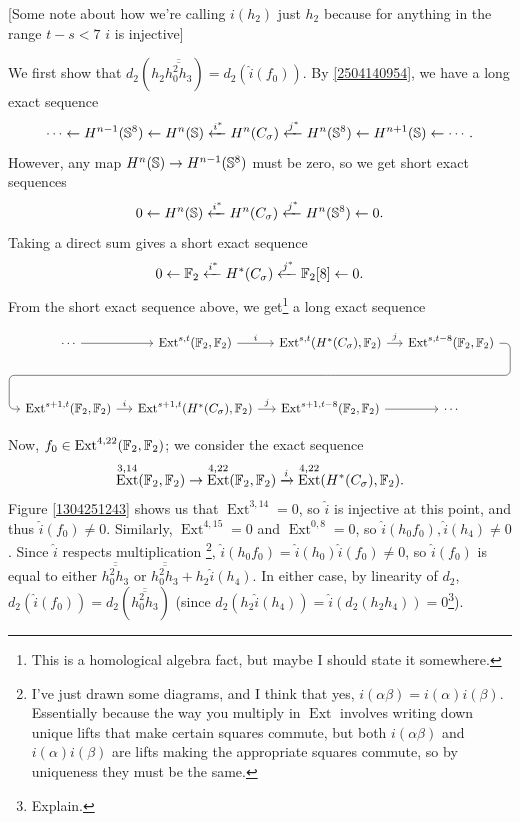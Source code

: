 \documentclass{MetricNotes2023}
\def\bb{\ensuremath\mathbb}
\DeclareMathOperator{\Ext}{Ext}
\begin{document}
\begin{ourproof}

[Some note about how we're calling \(i(h_2)\) just \(h_2\) because for anything in the range \(t-s<7\) \(i\) is injective]

We first show that \(d_2(h_2 \overline{\overline{h_0^2h_3}})=d_2(\hat i(f_0))\). By \ref{2504140954}, we have a long exact sequence
\[\cdots \leftarrow H^{n-1}(\bb{S}^8) \leftarrow H^n(\bb{S}) \xleftarrow{i^*} H^n(C_\sigma) \xleftarrow{j^*} H^n(\bb{S}^8)\leftarrow H^{n+1}(\bb{S}) \leftarrow \cdots.\]
However, any map \(H^n(\bb{S})\to H^{n-1}(\bb{S}^8)\) must be zero, so we get short exact sequences 
\[0 \leftarrow H^n(\bb{S})\xleftarrow{i^*} H^n(C_\sigma) \xleftarrow{j^*} H^n(\bb{S}^8)\leftarrow 0.\]
Taking a direct sum gives a short exact sequence
\[0 \leftarrow \bb{F}_2 \xleftarrow{i^*} H^*(C_\sigma) \xleftarrow{j^*} \bb{F}_2[8] \leftarrow 0.\]
From the short exact sequence above, we get\footnote{This is a homological algebra fact, but maybe I should state it somewhere.} a long exact sequence 

\[\begin{tikzcd}[row sep=8ex, column sep=3ex]
\cdots \arrow[r, ""] & \Ext^{s,t}(\bb{F}_2, \bb{F}_2) \arrow[r, "i"] & \Ext^{s,t}(H^*(C_\sigma), \bb{F}_2) \arrow[r, "j"] \ar[draw=none]{d}[name=X, anchor=center]{} & \Ext^{s,t-8}(\bb{F}_2, \bb{F}_2) \ar[rounded corners, to path={ -- ([xshift=2ex]\tikztostart.east) |- (X.center) \tikztonodes -| ([xshift=-2ex]\tikztotarget.west) -- (\tikztotarget)}]{dlll}[at end]{} \\
\Ext^{s+1,t}(\bb{F}_2, \bb{F}_2) \arrow[r, "i"] & \Ext^{s+1,t}(H^*(C_\sigma), \bb{F}_2) \arrow[r, "j"] & \Ext^{s+1,t-8}(\bb{F}_2, \bb{F}_2) \arrow[r, ""] & \cdots
\end{tikzcd}\]

Now, \(f_0\in \Ext^{4,22}(\bb{F}_2, \bb{F}_2)\); we consider the exact sequence
\[\Ext^{3,14}(\bb{F}_2, \bb{F}_2)\to \Ext^{4,22}(\bb{F}_2, \bb{F}_2) \xrightarrow{i} \Ext^{4,22}(H^*(C_\sigma), \bb{F}_2).\]
Figure \ref{1304251243} shows us that \(\Ext^{3,14}=0\), so \(\hat i\) is injective at this point, and thus \(\hat i(f_0)\neq 0\). Similarly, \(\Ext^{4,15}=0\) and \(\Ext^{0,8}=0\), so \(\hat i(h_0f_0), \hat i(h_4)\neq 0\). Since \(\hat i\) respects multiplication \footnote{I've just drawn some diagrams, and I think that yes, \(i(\alpha \beta)=i(\alpha)i(\beta)\). Essentially because the way you multiply in \(\Ext\) involves writing down unique lifts that make certain squares commute, but both \(i(\alpha \beta)\) and \(i(\alpha)i(\beta)\) are lifts making the appropriate squares commute, so by uniqueness they must be the same.}, \(\hat i(h_0f_0)=\hat i(h_0)\hat i(f_0)\neq 0\), so \(\hat i(f_0)\) is equal to either \(\overline{\overline{h_0^2h_3}}\) or \(\overline{\overline{h_0^2h_3}}+h_2\hat{i}(h_4)\). In either case, by linearity of \(d_2\), \(d_2(\hat i(f_0))=d_2(\overline{\overline{h_0^2h_3}})\) (since \(d_2(h_2\hat i (h_4))=\hat i(d_2(h_2h_4))=0\)\footnote{Explain.}).


\end{ourproof}
\end{document}
